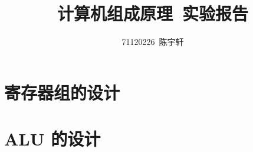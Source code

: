 \documentclass[no-math]{ctexrep}
\author{71120226\ 陈宇轩}
\title{计算机组成原理\ 实验报告}
\begin{document}
    \maketitle

    \tableofcontents

    \chapter{寄存器组的设计}

    

    \chapter{ALU 的设计}

    
\end{document}
